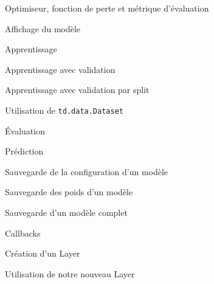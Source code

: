 \begin{frame}{Optimiseur, fonction de perte et métrique d'évaluation}
\end{frame}

\begin{frame}{Affichage du modèle}
\end{frame}

\begin{frame}{Apprentissage}
\end{frame}

\begin{frame}{Apprentissage avec validation}
\end{frame}

\begin{frame}{Apprentissage avec validation par split}
\end{frame}

\begin{frame}{Utilisation de \texttt{td.data.Dataset}}
\end{frame}

\begin{frame}{Évaluation}
\end{frame}

\begin{frame}{Prédiction}
\end{frame}

\begin{frame}{Sauvegarde de la configuration d'un modèle}
\end{frame}

\begin{frame}{Sauvegarde des poids d'un modèle}
\end{frame}

\begin{frame}{Sauvegarde d'un modèle complet}
\end{frame}

\begin{frame}{Callbacks}
\end{frame}

\begin{frame}{Création d'un Layer}
\end{frame}

\begin{frame}{Utilisation de notre nouveau Layer}
\end{frame}
